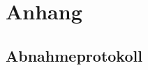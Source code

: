 %
%



\appendix
\chapter{Anhang}\label{chap.anhang}



\section{Abnahmeprotokoll}\label{anhang_abnahmeprotokoll}
